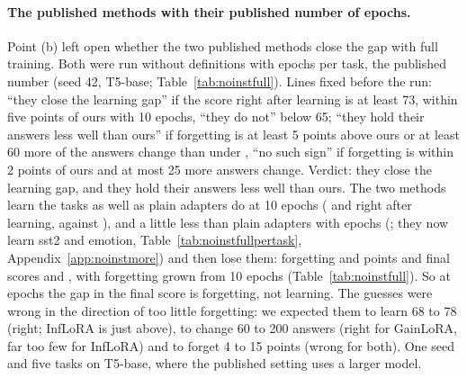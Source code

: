 \paragraph{The published methods with their published number of epochs.} Point (b) left open whether the two published methods close the gap with full training. Both were run without definitions with \AudFullEpochs{} epochs per task, the published number (seed 42, T5-base; Table~\ref{tab:noinstfull}).
Lines fixed before the run: ``they close the learning gap'' if the score right after learning is at least 73, within five points of ours with 10 epochs, ``they do not'' below 65; ``they hold their answers less well than ours'' if forgetting is at least 5 points above ours or at least 60 more of the \AudFullCompared{} answers change than under \recog{}, ``no such sign'' if forgetting is within 2 points of ours and at most 25 more answers change. Verdict: they close the learning gap, and they hold their answers less well than ours. The two methods learn the tasks as well as plain adapters do at 10 epochs (\AudFullInfloraLearned{} and \AudFullGainloraLearned{} right after learning, against \AudOursRidgeLearned{}), and a little less than plain adapters with \AudFullEpochs{} epochs (\AudFullOursRidgeLearned{}; they now learn sst2 and emotion, Table~\ref{tab:noinstfullpertask}, Appendix~\ref{app:noinstmore}) and then lose them: forgetting \AudFullInfloraFT{} and \AudFullGainloraFT{} points and final scores \AudFullInfloraAP{} and \AudFullGainloraAP{}, with forgetting grown from 10 epochs (Table~\ref{tab:noinstfull}). So at \AudFullEpochs{} epochs the gap in the final score is forgetting, not learning.
The guesses were wrong in the direction of too little forgetting: we expected them to learn 68 to 78 (right; InfLoRA is just above), to change 60 to 200 answers (right for GainLoRA, far too few for InfLoRA) and to forget 4 to 15 points (wrong for both). One seed and five tasks on T5-base, where the published setting uses a larger model.

